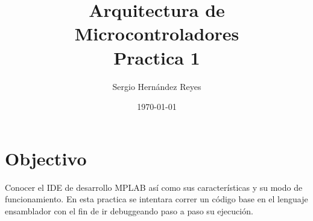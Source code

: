 \documentclass{article}
\title{Arquitectura de Microcontroladores \\ Practica 1} %
\author{Sergio Hernández Reyes} %
\date{\today} %
\begin{document}
\maketitle %



\section{Objectivo}

Conocer el IDE de desarrollo MPLAB así como sus características y su modo de funcionamiento. En esta practica se intentara correr un código base en el lenguaje ensamblador con el fin de ir debuggeando paso a paso su ejecución.



\end{document}
